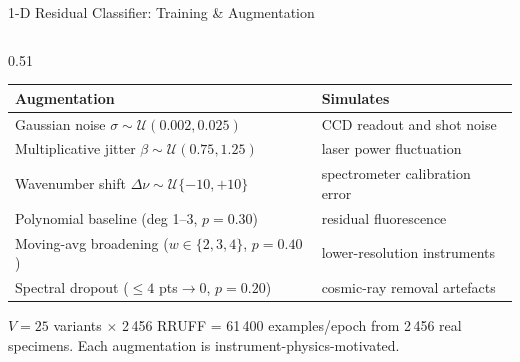 \documentclass[aspectratio=169,10pt]{beamer}
\begin{document}
\begin{frame}{1-D Residual Classifier: Training \& Augmentation}
\begin{columns}[T]
\begin{column}{0.51\textwidth}
      \vspace{0.04cm}
      \footnotesize
      \begin{tabular}{@{}lp{3.8cm}@{}}
        \toprule
        \textbf{Augmentation} & \textbf{Simulates}\\
        \midrule
        Gaussian noise $\sigma\!\sim\!\mathcal{U}(0.002,0.025)$
          & CCD readout and shot noise\\
        Multiplicative jitter $\beta\!\sim\!\mathcal{U}(0.75,1.25)$
          & laser power fluctuation\\
        Wavenumber shift $\Delta\nu\!\sim\!\mathcal{U}\{-10,{+}10\}$
          & spectrometer calibration error\\
        Polynomial baseline (deg 1--3, $p{=}0.30$)
          & residual fluorescence\\
        Moving-avg broadening ($w\!\in\!\{2,3,4\}$, $p{=}0.40$)
          & lower-resolution instruments\\
        Spectral dropout ($\le4$ pts$\to0$, $p{=}0.20$)
          & cosmic-ray removal artefacts\\
        \bottomrule
      \end{tabular}

      \vspace{0.06cm}
      \begin{tcolorbox}[insightbox, top=2pt, bottom=2pt]
        \scriptsize $V{=}25$ variants $\times$ 2\,456 RRUFF = 61\,400
        examples/epoch from 2\,456 real specimens.
        Each augmentation is instrument-physics-motivated.
      \end{tcolorbox}
    \end{column}
  \end{columns}
\end{frame}
\end{document}
